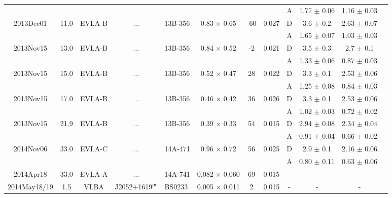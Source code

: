 \documentclass[]{aa} %
\begin{document}
\begin{table*}
\begin{center}
\begin{tabular}{c c c c l c c c c c c c}
                   &             &                &      &       & && & A          & 1.77 $\pm$ 0.06       & 1.16 $\pm$ 0.03    \\
    2013Dec01      & 11.0       & EVLA-B  &...        & 13B-356     &0.83 $\times$ 0.65 &-60&0.027 & D          & 3.6 $\pm$ 0.2       & 2.63 $\pm$ 0.07    \\
                   &             &                &       &      & && & A          & 1.65 $\pm$ 0.07       & 1.03 $\pm$ 0.03    \\
    2013Nov15      & 13.0       & EVLA-B  &...        & 13B-356     &0.84 $\times$ 0.52&-2& 0.021 & D          & 3.5 $\pm$ 0.3       & 2.7 $\pm$ 0.1    \\
                   &             &                &      &       & &&  &A          & 1.33 $\pm$ 0.06       & 0.87 $\pm$ 0.03    \\
    2013Nov15      & 15.0       & EVLA-B   &...       & 13B-356     & 0.52 $\times$ 0.47 &28&0.022 &D          & 3.3 $\pm$ 0.1       & 2.53 $\pm$ 0.06    \\
                   &             &                &      &       & && & A          & 1.25 $\pm$ 0.08       & 0.84 $\pm$ 0.03    \\
    2013Nov15      & 17.0       & EVLA-B  &...        & 13B-356     &0.46 $\times$ 0.42 &36& 0.026& D          &3.3 $\pm$ 0.1       & 2.53 $\pm$ 0.06    \\
                   &             &                &     &        & && & A          & 1.02 $\pm$ 0.03       & 0.72 $\pm$ 0.02    \\
    2013Nov15      & 21.9       & EVLA-B   &...       & 13B-356     &0.39 $\times$ 0.33 &54&0.015 & D          & 2.94 $\pm$ 0.08       & 2.34 $\pm$ 0.04    \\
                   &             &                &       &      & && & A          & 0.91 $\pm$ 0.04       & 0.66 $\pm$ 0.02    \\
    2014Nov06      & 33.0       & EVLA-C  &...        & 14A-471     &0.96 $\times$ 0.72 &56&0.025 & D          & 2.9 $\pm$ 0.1       & 2.16 $\pm$ 0.06    \\
                   &             &                &      &       &&&   &A          & 0.80 $\pm$ 0.11       & 0.63 $\pm$ 0.06    \\
   2014Apr18      & 33.0       & EVLA-A &...         & 14A-741  &0.082 $\times$ 0.060 & 69& 0.015 &  -          & -      &-    \\
   2014May18/19      & 1.5       & VLBA &  J2052+1619$\rm ^{pr}$       & BS0233  &0.005 $\times$ 0.011 & 2 &0.015&  -          & -      &-    \\


\end{tabular}
\end{center}
\end{table*}
\end{document}
